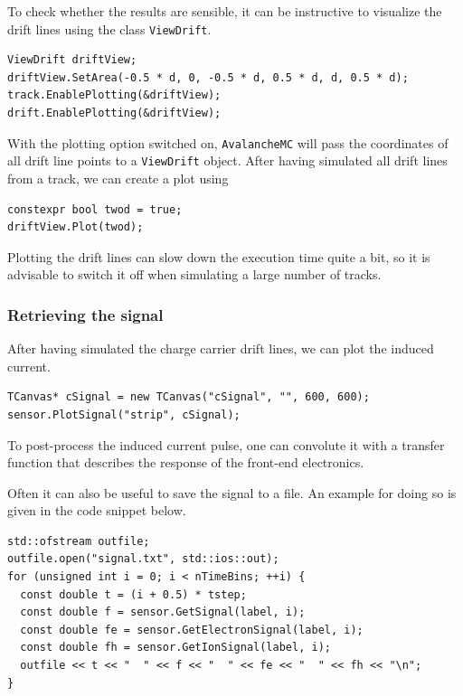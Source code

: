 To check whether the results are sensible, 
it can be instructive to visualize the drift lines 
using the class \texttt{ViewDrift}.
\begin{lstlisting}
ViewDrift driftView;
driftView.SetArea(-0.5 * d, 0, -0.5 * d, 0.5 * d, d, 0.5 * d);
track.EnablePlotting(&driftView);
drift.EnablePlotting(&driftView);
\end{lstlisting}
With the plotting option switched on, \texttt{AvalancheMC} 
will pass the coordinates of all drift line points 
to a \texttt{ViewDrift} object. 
After having simulated all drift lines from a track, we can create a plot using
\begin{lstlisting}
constexpr bool twod = true;
driftView.Plot(twod);
\end{lstlisting}
Plotting the drift lines can slow down the execution time quite a bit, so it is advisable to switch it off when simulating a large number of tracks.

\subsubsection{Retrieving the signal}
After having simulated the charge carrier drift lines, 
we can plot the induced current.
\begin{lstlisting}
TCanvas* cSignal = new TCanvas("cSignal", "", 600, 600);
sensor.PlotSignal("strip", cSignal);
\end{lstlisting}

To post-process the induced current pulse, one can convolute 
it with a transfer function that describes the response 
of the front-end electronics.

Often it can also be useful to save the signal to a file. 
An example for doing so is given in the code snippet below.
\begin{lstlisting}
std::ofstream outfile;
outfile.open("signal.txt", std::ios::out);
for (unsigned int i = 0; i < nTimeBins; ++i) {
  const double t = (i + 0.5) * tstep;
  const double f = sensor.GetSignal(label, i);
  const double fe = sensor.GetElectronSignal(label, i);
  const double fh = sensor.GetIonSignal(label, i);
  outfile << t << "  " << f << "  " << fe << "  " << fh << "\n";
}
\end{lstlisting}

